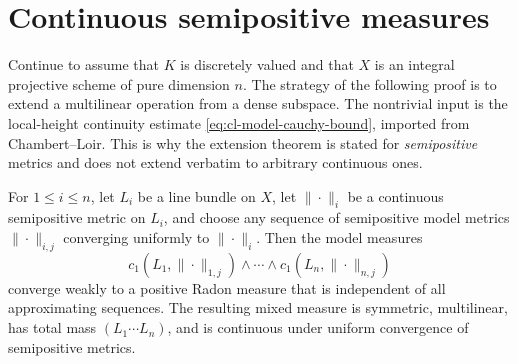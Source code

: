 \section{Continuous semipositive measures}
\label{sec:metrics-continuous-cl}

Continue to assume that $K$ is discretely valued and that $X$ is an
integral projective scheme of pure dimension $n$. The strategy of the
following proof is to extend a multilinear operation from a dense
subspace. The nontrivial input is the local-height continuity estimate
\eqref{eq:cl-model-cauchy-bound}, imported from Chambert--Loir. This is why
the extension theorem is stated for \emph{semipositive} metrics and does not
extend verbatim to arbitrary continuous ones.

\begin{theorem}\label{thm:cl-continuous-extension}
For $1\leq i\leq n$, let $L_i$ be a line bundle on $X$, let
$\|\cdot\|_i$ be a continuous semipositive metric on $L_i$, and choose
any sequence of semipositive model metrics $\|\cdot\|_{i,j}$ converging
uniformly to $\|\cdot\|_i$. Then the model measures
\[
 c_1(L_1,\|\cdot\|_{1,j})\wedge\cdots\wedge
 c_1(L_n,\|\cdot\|_{n,j})
\]
converge weakly to a positive Radon measure that is independent of all
approximating sequences. The resulting mixed measure is symmetric,
multilinear, has total mass $(L_1\cdots L_n)$, and is continuous under
uniform convergence of semipositive metrics.
\end{theorem}
